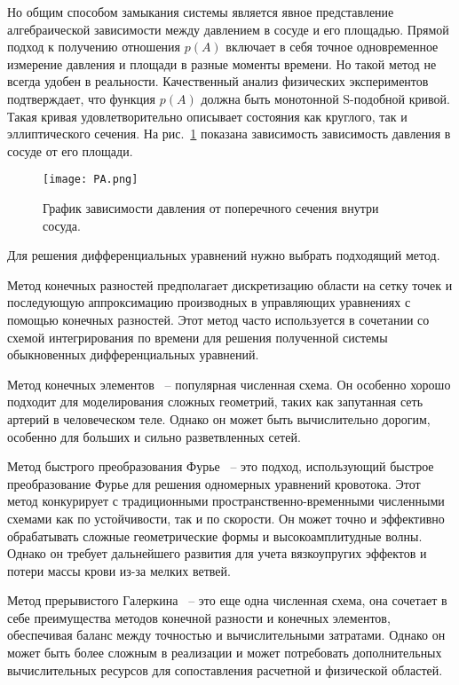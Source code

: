 Но общим способом замыкания системы является явное представление алгебраической зависимости
между давлением в сосуде и его площадью. Прямой подход к получению отношения $p(A)$ включает в себя точное одновременное измерение
давления и площади в разные моменты времени. Но такой метод не всегда удобен в реальности.
Качественный анализ физических экспериментов подтверждает, что функция $p(A)$ должна быть монотонной S-подобной кривой. 
Такая кривая удовлетворительно описывает состояния как круглого, так и эллиптического сечения. На рис.~\ref{ych} показана зависимость
зависимость давления в сосуде от его площади.


\begin{figure}[h]
    \centering
    \texttt{[image: PA.png]}
    \caption{График зависимости давления от поперечного сечения внутри сосуда.}
    \label{ych}
\end{figure}

Для решения дифференциальных уравнений нужно выбрать подходящий метод.

Метод конечных разностей предполагает дискретизацию области на сетку точек и последующую аппроксимацию производных в управляющих
уравнениях с помощью конечных разностей. Этот метод часто используется в сочетании со схемой интегрирования по времени для решения 
полученной системы обыкновенных дифференциальных уравнений.

Метод конечных элементов~\cite{TAYLOR1998} -- популярная численная схема. 
Он особенно хорошо подходит для моделирования сложных геометрий, таких как запутанная сеть артерий в человеческом теле. 
Однако он может быть вычислительно дорогим, особенно для больших и сильно разветвленных сетей. 

Метод быстрого преобразования Фурье~\cite{Sazonov:2019} -- 
это подход, использующий быстрое преобразование Фурье для решения одномерных уравнений кровотока. 
Этот метод конкурирует с традиционными пространственно-временными численными схемами как по устойчивости, так и по скорости. 
Он может точно и эффективно обрабатывать сложные геометрические формы и высокоамплитудные волны. 
Однако он требует дальнейшего развития для учета вязкоупругих эффектов и потери массы крови из-за мелких ветвей. 

Метод прерывистого Галеркина~\cite{yao:2017} -- это еще одна численная схема, она сочетает в себе преимущества методов конечной разности и конечных элементов, 
обеспечивая баланс между точностью и вычислительными затратами. Однако он может быть более сложным в реализации и может
потребовать дополнительных вычислительных ресурсов для сопоставления расчетной и физической областей.

